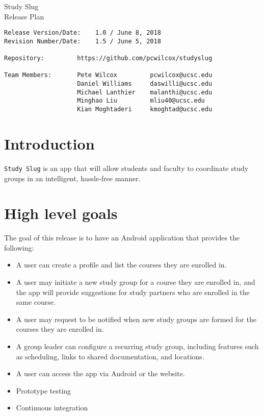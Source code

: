 \documentclass[10pt]{article}
\begin{document}
    
    \begin{center}
        \Huge{Study Slug} \\
        \Large{Release Plan}
    \end{center}
    \begin{verbatim}
Release Version/Date:    1.0 / June 8, 2018        
Revision Number/Date:    1.5 / June 5, 2018

Repository:         https://github.com/pcwilcox/studyslug

Team Members:       Pete Wilcox         pcwilcox@ucsc.edu    
                    Daniel Williams     daswilli@ucsc.edu  
                    Michael Lanthier    malanthi@ucsc.edu  
                    Minghao Liu         mliu40@ucsc.edu
                    Kian Moghtaderi     kmoghtad@ucsc.edu
    \end{verbatim}
    
    \section{Introduction}
    \texttt{Study Slug} is an app that will allow students and faculty to coordinate study groups in an intelligent, hassle-free manner.
    
    \section{High level goals}
    The goal of this release is to have an Android application that provides the following:
    \begin{itemize}
        \item A user can create a profile and list the courses they are enrolled in.
        \item A user may initiate a new study group for a course they are enrolled in, and the app will provide suggestions for study partners who are enrolled in the same course.
        \item A user may request to be notified when new study groups are formed for the courses they are enrolled in.
        \item A group leader can configure a recurring study group, including features such as scheduling, links to shared documentation, and locations.
        \item A user can access the app via Android or the website.
        \item Prototype testing
        \item Continuous integration
    \end{itemize}
    
\end{document}
